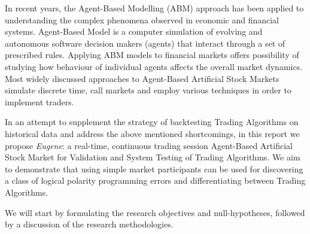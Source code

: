 In recent years, the Agent-Based Modelling (ABM) approach has been applied to understanding the complex phenomena observed in economic and financial systems. Agent-Based Model is a computer simulation of evolving and autonomous software decision makers (agents) that interact through a set of prescribed rules. Applying ABM models to financial markets offers possibility of studying how behaviour of individual agents affects the overall market dynamics. \cite{Sorban2008}\cite{Farmer2009} Most widely discussed approaches to Agent-Based Artificial Stock Markets simulate discrete time, call markets and employ various techniques in order to implement traders. \cite{Jha2010}

In an attempt to supplement the strategy of backtesting Trading Algorithms on historical data and address the above mentioned shortcomings, in this report we propose \emph{Eugene}: a real-time, continuous trading session Agent-Based Artificial Stock Market for Validation and System Testing of Trading Algorithms. We aim to demonstrate that using simple market participants can be used for discovering a class of logical polarity programming errors and differentiating between Trading Algorithms.

We will start by formulating the research objectives and null-hypotheses, followed by a discussion of the research methodologies.




